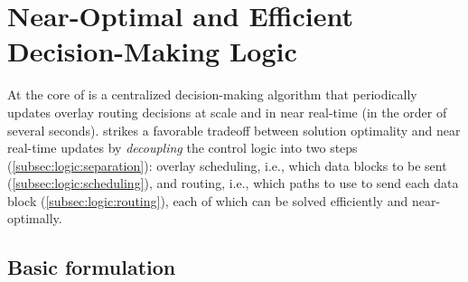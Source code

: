 \section{Near-Optimal and Efficient Decision-Making Logic}
\label{sec:logic}

At the core of \name is a centralized decision-making algorithm that
periodically updates overlay routing decisions at scale and in near
real-time (in the order of several seconds). \name strikes a favorable tradeoff
between solution optimality and near real-time updates by
{\em decoupling} the control logic into two steps
(\Section\ref{subsec:logic:separation}):
overlay scheduling, i.e., which data blocks to be sent
(\Section\ref{subsec:logic:scheduling}),
and routing, i.e., which paths to use to send each data block
(\Section\ref{subsec:logic:routing}), each of which
can be solved efficiently and near-optimally.%

\subsection{Basic formulation}
\label{subsec:logic:formulation}


